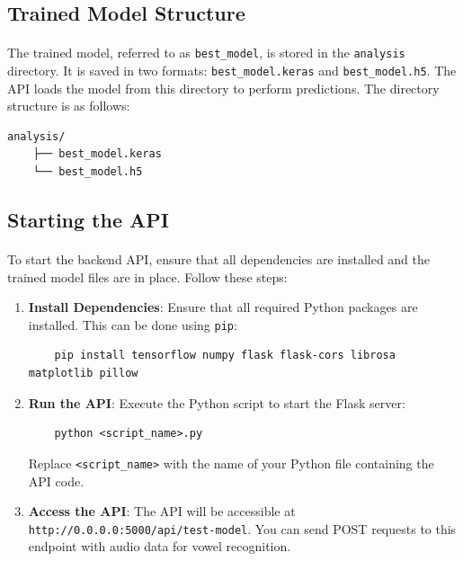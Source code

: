 \subsection{Trained Model Structure}
\label{subsec:model-structure}

\paragraph{}
The trained model, referred to as \texttt{best\_model}, is stored in the \texttt{analysis} directory. It is saved in two formats: \texttt{best\_model.keras} and \texttt{best\_model.h5}. The API loads the model from this directory to perform predictions. The directory structure is as follows:

\begin{verbatim}
analysis/
    ├── best_model.keras
    └── best_model.h5
\end{verbatim}

\subsection{Starting the API}
\label{subsec:starting-api}

\paragraph{}
To start the backend API, ensure that all dependencies are installed and the trained model files are in place. Follow these steps:

\begin{enumerate}
    \item \textbf{Install Dependencies}: Ensure that all required Python packages are installed. This can be done using \texttt{pip}:
    \begin{verbatim}
    pip install tensorflow numpy flask flask-cors librosa matplotlib pillow
    \end{verbatim}

    \item \textbf{Run the API}: Execute the Python script to start the Flask server:
    \begin{verbatim}
    python <script_name>.py
    \end{verbatim}
    Replace \texttt{<script\_name>} with the name of your Python file containing the API code.

    \item \textbf{Access the API}: The API will be accessible at \texttt{http://0.0.0.0:5000/api/test-model}. You can send POST requests to this endpoint with audio data for vowel recognition.
\end{enumerate}

